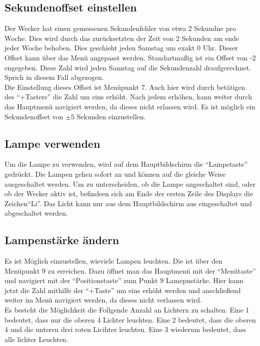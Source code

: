 \documentclass[12pt,a4paper,titlepage,headinclude]{scrartcl}
\numberwithin{equation}{subsection}
\begin{document}
\subsection{Sekundenoffset einstellen}
Der Wecker hat einen gemessenen Sekundenfehler von etwa 2 Sekundne pro Woche.
Dies wird durch das zurücksetzten der Zeit von 2 Sekunden am ende jeder Woche behoben.
Dies geschieht jeden Samstag um exakt 0 Uhr.
Dieser Offset kann über das Menü angepasst werden.
Standartmaßig ist ein Offset von -2 engegeben.
Diese Zahl wird jeden Samstag auf die Sekundenzahl draufgerechnet.
Sprich in diesem Fall abgezogen.\\
Die Einstellung dieses Offset ist Menüpunkt 7.
Auch hier wird durch betätigen des "`+Tasters"' die Zahl um eins erhöht.
Nach jedem erhöhen, kann weiter durch das Hauptmenü navigiert werden, da dieses nicht erlassen wird.
Es ist möglich ein Sekundenoffset von $\pm5$ Sekunden einzustellen.


\subsection{Lampe verwenden}
Um die Lampe zu verwenden, wird auf dem Hauptbildschirm die "`Lampetaste"' gedrückt.
Die Lampen gehen sofort an und können auf die gleiche Weise ausgeschaltet werden.
Um zu unterscheiden, ob die Lampe angeschaltet sind, oder ob der Wecker aktiv ist, befindeen sich am Ende der ersten Zeile des Displays die Zeichen"`Li"'.
Das Licht kann nur aus dem Hauptbildschirm aus eingeschaltet und abgeschaltet werden.

\subsection{Lampenstärke ändern}
Es ist Möglich einzustellen, wieviele Lampen leuchten.
Die ist über den Menüpunkt 9 zu erreichen.
Dazu öffnet man das Hauptmenü mit der "`Menütaste"' und navigiert mit der "`Positionstaste"' zum Punkt 9 Lamepnstärke.
Hier kann jetzt die Zahl mithilfe der "`+Taste"' um eins erhöht werden und anschließend weiter im Menü navigiert werden, da dieses nicht verlassen wird.\\
Es besteht die Möglichkeit die Follgende Anzahl an Lichtern zu schalten.
Eine 1 bedeutet, dass nur die oberen 4 Lichter leuchten.
Eine 2 bedeutet, dass die oberen 4 und die unteren drei roten Licihter leuchten.
Eine 3 wiederum bedeutet, dass alle lichter Leuchten.
\end{document}
